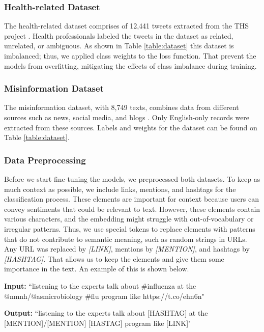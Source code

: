 \subsubsection{Health-related Dataset}
The health-related dataset comprises of 12,441 tweets extracted from the THS project \cite{8622504}. Health professionals labeled the tweets in the dataset as related, unrelated, or ambiguous.
As shown in Table \ref{table:dataset} this dataset is imbalanced; thus, we applied class weights to the loss function. That prevent the models from overfitting, mitigating the effects of class
imbalance during training.

\subsubsection{Misinformation Dataset}
The misinformation dataset, with 8,749 texts, combines data from different sources such as news, social media, and blogs \cite{stephencrone2022,coviddata,covidunesco}. Only English-only records were extracted from these sources. Labels and weights for the dataset can be found on Table \ref{table:dataset}.

\subsubsection{Data Preprocessing}
Before we start fine-tuning the models, we preprocessed both datasets. To keep as much context as possible, we include links, mentions, and hashtags for the classification process.
These elements are important for context because users can convey sentiments that could be relevant to text. However, these elements contain various characters, and the embedding might struggle with out-of-vocabulary or irregular
patterns. Thus, we use special tokens to replace elements with patterns that do not contribute to semantic meaning, such as random strings in URLs. Any URL was replaced by \textit{[LINK]}, mentions by \textit{[MENTION]}, and hashtags by \textit{[HASHTAG]}. That allows us to keep the elements and give them some importance in the text. An example of this is shown below.

{\footnotesize %
\begin{tcolorbox}[colback=gray!5,colframe=black!50,boxrule=0.4pt,arc=2pt,left=0.5mm,right=0.5mm,top=0.1mm,bottom=0.1mm,title=Example]
\textbf{Input:}  
``listening to the experts talk about \#influenza at the @nmnh/@asmicrobiology \#flu program like https://t.co/ehn6n"

\vspace{0.25em}
\textbf{Output:}  
``listening to the experts talk about [HASHTAG] at the [MENTION]/[MENTION] [HASTAG] program like [LINK]"
\end{tcolorbox}
}

